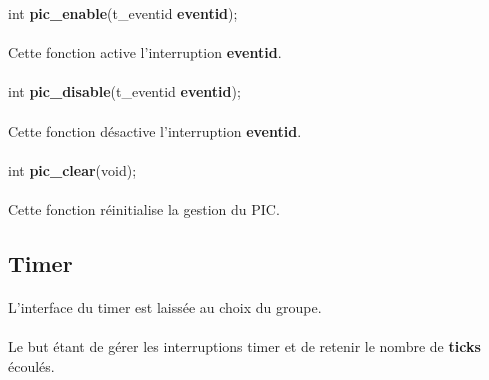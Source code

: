 \documentclass[10pt,a4wide]{article}
\begin{document}
\hspace{1.5cm}int \textbf{pic\_enable}(t\_eventid \textbf{eventid});

\paragraph{}

Cette fonction active l'interruption \textbf{eventid}.

\paragraph{}

\hspace{1.5cm}int \textbf{pic\_disable}(t\_eventid \textbf{eventid});

\paragraph{}

Cette fonction d\'esactive l'interruption \textbf{eventid}.

\paragraph{}

\hspace{1.5cm}int \textbf{pic\_clear}(void);

\paragraph{}

Cette fonction r\'einitialise la gestion du PIC.

\subsection{Timer}

\paragraph{}

L'interface du timer est laiss\'ee au choix du groupe.

\paragraph{}

Le but \'etant de g\'erer les interruptions timer et de retenir le nombre
de \textbf{ticks} \'ecoul\'es.
\end{document}
